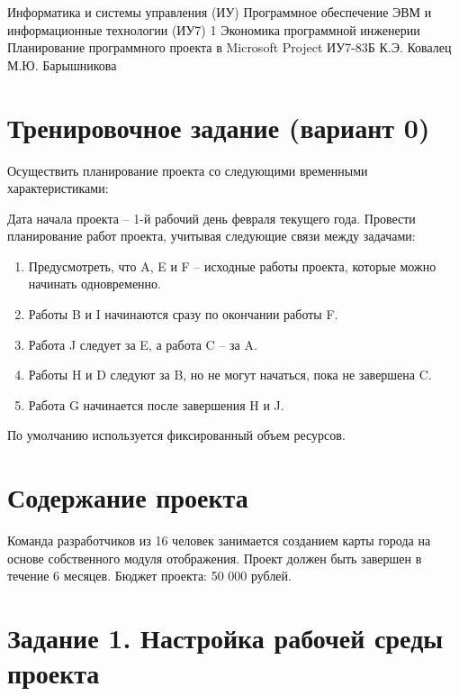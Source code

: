 \documentclass{bmstu}
\begin{document}
\makereporttitle
{Информатика и системы управления (ИУ)}
{Программное обеспечение ЭВМ и информационные технологии (ИУ7)}
{1}
{Экономика программной инженерии}
{Планирование программного проекта в Microsoft Project}
{}
{ИУ7-83Б}
{К.Э. Ковалец}
{М.Ю. Барышникова}


\setcounter{page}{2}

\section*{Тренировочное задание (вариант 0)}

Осуществить планирование проекта со следующими временными характеристиками:


Дата начала проекта -- 1-й рабочий день февраля текущего года.
Провести планирование работ проекта, учитывая следующие связи между задачами:

\begin{enumerate}
    \item Предусмотреть, что A, E и F -- исходные работы проекта, которые можно начинать
    одновременно.
    \item Работы B и I начинаются сразу по окончании работы F.
    \item Работа J следует за E, а работа C -- за A.
    \item Работы H и D следуют за B, но не могут начаться, пока не завершена C.
    \item Работа G начинается после завершения H и J.
\end{enumerate}


По умолчанию используется фиксированный объем ресурсов.


\clearpage

\section*{Содержание проекта}

Команда разработчиков из 16 человек занимается созданием карты города на основе собственного модуля отображения. Проект должен быть завершен в течение 6 месяцев. Бюджет проекта: 50 000 рублей.

\section*{Задание 1. Настройка рабочей среды проекта}
\end{document}
